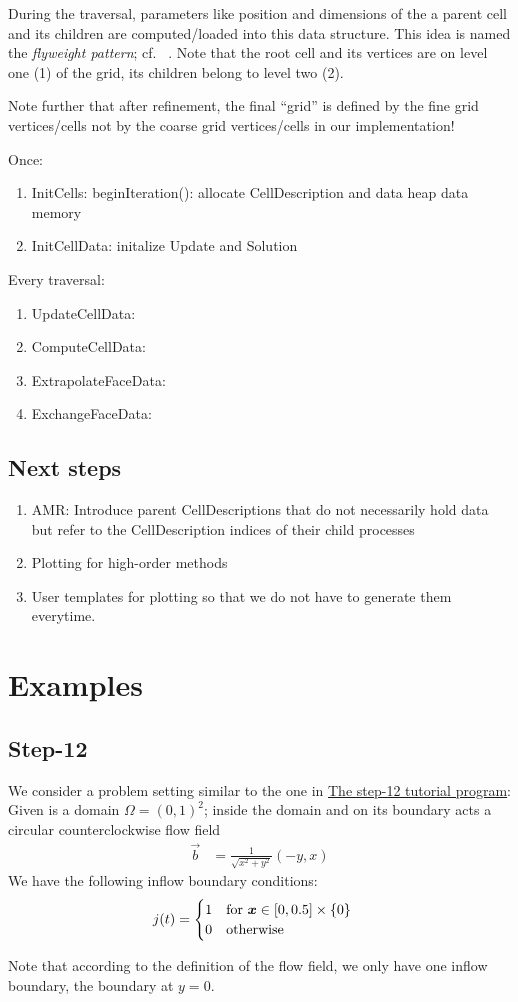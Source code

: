\documentclass{scrreprt}
\begin{document}
During the traversal, parameters like position and dimensions of the 
a parent cell and its children are computed/loaded into this data structure. 
This idea is named the \textit{flyweight pattern}; cf.~ \cite{gangoffour}.   
Note that the root cell and its vertices are on level one (1) of the grid,
its children belong to level two (2).

Note further that after refinement, the final ``grid'' is defined by the fine
grid vertices/cells not by the coarse grid vertices/cells in our implementation!


Once:
\begin{enumerate}
  \item InitCells: beginIteration(): allocate CellDescription and data heap data
  memory
  \item InitCellData: initalize Update and Solution
\end{enumerate}

Every traversal:
\begin{enumerate}
  \item UpdateCellData: 
  \item ComputeCellData:
  \item ExtrapolateFaceData:
  \item ExchangeFaceData: 
\end{enumerate}

\section{Next steps}
\begin{enumerate}
  \item AMR: Introduce parent CellDescriptions that do not necessarily hold data
  but refer to the CellDescription indices of their child processes
  \item Plotting for high-order methods
  \item User templates for plotting so that we do not have to generate them
  everytime.
\end{enumerate}

\chapter{Examples}
\section{Step-12}
We consider a problem setting similar to the one in
\href{http://www.dealii.org/developer/doxygen/deal.II/step_12.html}{The
step-12 tutorial program}:
Given is a domain $\Omega=(0,1)^2$; inside the domain and on its boundary acts
a circular counterclockwise flow field
\begin{align}
\vec{b} &= \frac{1}{\sqrt{x^2+y^2}}(-y,x)
\end{align}
We have the following inflow boundary conditions:
\begin{align}
j(t) &=
\begin{cases}
1 & \textup{for } {\boldsymbol x}\in [0,0.5]\times\{0\} \\
0 & \textup{otherwise}
\end{cases}
\end{align}

Note that according to the definition of the flow field, we only have one inflow
boundary, the boundary at $y=0$.

{}
\end{document}
